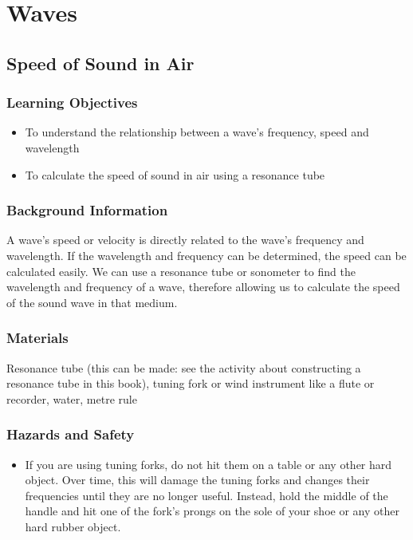 

\section*{Waves}


\subsection{Speed of Sound in Air}

\subsubsection*{Learning Objectives}
\begin{itemize}
\item{To understand the relationship between a wave's frequency, speed and wavelength} 
\item{To calculate the speed of sound in air using a resonance tube} 
\end{itemize}

\subsubsection*{Background Information}
A wave's speed or velocity is directly related to the wave's frequency and wavelength. If the wavelength and frequency can be determined, the speed can be calculated easily. We can use a resonance tube or sonometer to find the wavelength and frequency of a wave, therefore allowing us to calculate the speed of the sound wave in that medium.  

\subsubsection*{Materials}
Resonance tube (this can be made: see the activity about constructing a resonance tube in this book), tuning fork or wind instrument like a flute or recorder, water, metre rule

\subsubsection*{Hazards and Safety}
\begin{itemize}
\item{If you are using tuning forks, do not hit them on a table or any other hard object. Over time, this will damage the tuning forks and changes their frequencies until they are no longer useful. Instead, hold the middle of the handle and hit one of the fork's prongs on the sole of your shoe or any other hard rubber object.} 
\end{itemize}

